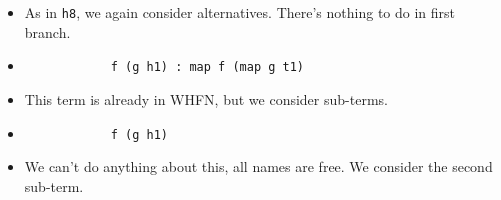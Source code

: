 \documentclass{beamer}
\begin{document}
\begin{frame}[fragile]

    \begin{itemize}[<+->]
        \item[] As in \texttt{h8}, we again consider alternatives. There's
            nothing to do in first branch.

        \item[]
            \begin{verbatim}
            f (g h1) : map f (map g t1)
            \end{verbatim}

        \item[]
            This term is already in WHFN, but we consider sub-terms.

        \item[]
            \begin{verbatim}
            f (g h1)
            \end{verbatim}

        \item[] We can't do anything about this, all names are free. We consider
            the second sub-term.

    \end{itemize}

\end{frame}
\end{document}
